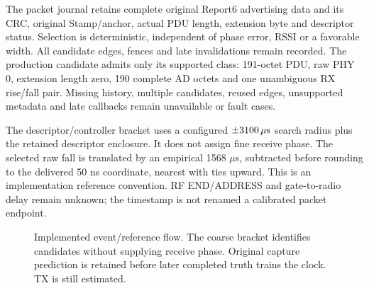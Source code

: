 \documentclass[10pt,letterpaper]{article}
\begin{document}
The packet journal retains complete original Report6 advertising data and its CRC, original Stamp/anchor, actual PDU length, extension byte and descriptor status. Selection is deterministic, independent of phase error, RSSI or a favorable width. All candidate edges, fences and late invalidations remain recorded. The production candidate admits only its supported class: 191-octet PDU, raw PHY 0, extension length zero, 190 complete AD octets and one unambiguous RX rise/fall pair. Missing history, multiple candidates, reused edges, unsupported metadata and late callbacks remain unavailable or fault cases.

The descriptor/controller bracket uses a configured $\pm3100\,\mu\mathrm{s}$ search radius plus the retained descriptor enclosure. It does not assign fine receive phase. The selected raw fall is translated by an empirical 1568 $\mu$s, subtracted before rounding to the delivered 50 ns coordinate, nearest with ties upward. This is an implementation reference convention. RF END/ADDRESS and gate-to-radio delay remain unknown; the timestamp is not renamed a calibrated packet endpoint.

\begin{figure}[ht]\centering
{}
\caption{Implemented event/reference flow. The coarse bracket identifies candidates without supplying receive phase. Original capture prediction is retained before later completed truth trains the clock. TX is still estimated.}
\end{figure}
\end{document}
